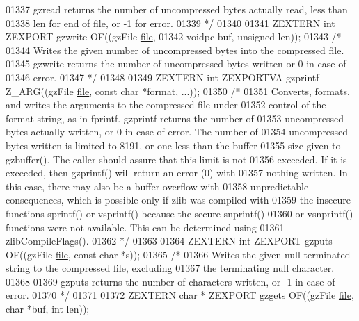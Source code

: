 \begin{DoxyCode}
01337 \textcolor{comment}{     gzread returns the number of uncompressed bytes actually read, less than}
01338 \textcolor{comment}{   len for end of file, or -1 for error.}
01339 \textcolor{comment}{*/}
01340 
01341 ZEXTERN \textcolor{keywordtype}{int} ZEXPORT gzwrite OF((gzFile \hyperlink{structfile}{file},
01342                                 voidpc buf, \textcolor{keywordtype}{unsigned} len));
01343 \textcolor{comment}{/*}
01344 \textcolor{comment}{     Writes the given number of uncompressed bytes into the compressed file.}
01345 \textcolor{comment}{   gzwrite returns the number of uncompressed bytes written or 0 in case of}
01346 \textcolor{comment}{   error.}
01347 \textcolor{comment}{*/}
01348 
01349 ZEXTERN \textcolor{keywordtype}{int} ZEXPORTVA gzprintf Z\_ARG((gzFile \hyperlink{structfile}{file}, \textcolor{keyword}{const} \textcolor{keywordtype}{char} *format, ...));
01350 \textcolor{comment}{/*}
01351 \textcolor{comment}{     Converts, formats, and writes the arguments to the compressed file under}
01352 \textcolor{comment}{   control of the format string, as in fprintf.  gzprintf returns the number of}
01353 \textcolor{comment}{   uncompressed bytes actually written, or 0 in case of error.  The number of}
01354 \textcolor{comment}{   uncompressed bytes written is limited to 8191, or one less than the buffer}
01355 \textcolor{comment}{   size given to gzbuffer().  The caller should assure that this limit is not}
01356 \textcolor{comment}{   exceeded.  If it is exceeded, then gzprintf() will return an error (0) with}
01357 \textcolor{comment}{   nothing written.  In this case, there may also be a buffer overflow with}
01358 \textcolor{comment}{   unpredictable consequences, which is possible only if zlib was compiled with}
01359 \textcolor{comment}{   the insecure functions sprintf() or vsprintf() because the secure snprintf()}
01360 \textcolor{comment}{   or vsnprintf() functions were not available.  This can be determined using}
01361 \textcolor{comment}{   zlibCompileFlags().}
01362 \textcolor{comment}{*/}
01363 
01364 ZEXTERN \textcolor{keywordtype}{int} ZEXPORT gzputs OF((gzFile \hyperlink{structfile}{file}, \textcolor{keyword}{const} \textcolor{keywordtype}{char} *s));
01365 \textcolor{comment}{/*}
01366 \textcolor{comment}{     Writes the given null-terminated string to the compressed file, excluding}
01367 \textcolor{comment}{   the terminating null character.}
01368 \textcolor{comment}{}
01369 \textcolor{comment}{     gzputs returns the number of characters written, or -1 in case of error.}
01370 \textcolor{comment}{*/}
01371 
01372 ZEXTERN \textcolor{keywordtype}{char} * ZEXPORT gzgets OF((gzFile \hyperlink{structfile}{file}, \textcolor{keywordtype}{char} *buf, \textcolor{keywordtype}{int} len));

\end{DoxyCode}
